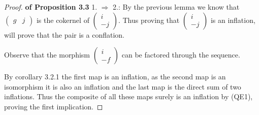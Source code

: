 \documentclass[12pt]{article}
\theoremstyle{definition}
\theoremstyle{remark}
\begin{document}
            \begin{proof}
                \textbf{of Proposition 3.3} 1. $\Rightarrow$ 2.: By the previous lemma we know that $\begin{pmatrix}
                    g & j
                \end{pmatrix}$ is the cokernel of $\begin{pmatrix}
                    i \\ -j
                \end{pmatrix}$. Thus proving that $\begin{pmatrix}
                    i \\ -j
                \end{pmatrix}$ is an inflation, will prove that the pair is a conflation. 
                
                Observe that the morphism $\begin{pmatrix}
                    i \\ -f
                \end{pmatrix}$ can be factored through the sequence. 
                \begin{center}
                \end{center}
                By corollary 3.2.1 the first map is an inflation, as the second map is an isomorphism it is also an inflation and the last map is the direct sum of two inflations. Thus the composite of all these maps surely is an inflation by (QE1), proving the first implication.


\end{proof}
\end{document}
